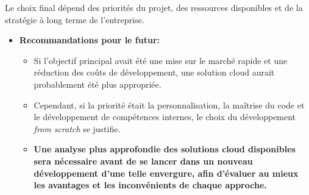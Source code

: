 Le choix final dépend des priorités du projet, des ressources disponibles et de la stratégie à long terme de l'entreprise.

\begin{itemize}
\item {\bf Recommandations pour le futur:}
	\begin{itemize}
    \item Si l'objectif principal avait été une mise sur le marché rapide et une réduction des coûts de développement, une solution cloud aurait probablement été plus appropriée.
    \item Cependant, si la priorité était la personnalisation, la maîtrise du code et le développement de compétences internes, le choix du développement {\it from scratch} se justifie.
    \item {\bf Une analyse plus approfondie des solutions cloud disponibles sera nécessaire avant de se lancer dans un nouveau développement d'une telle envergure, afin d'évaluer au mieux les avantages et les inconvénients de chaque approche.}
	\end{itemize}
\end{itemize}
